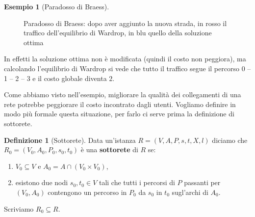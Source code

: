 \documentclass[a4paper]{article}
\newcounter{counter1}
\theoremstyle{plain}
\theoremstyle{definition}
\newtheorem{mydef}[counter1]{Definizione}
\newtheorem{myes}[counter1]{Esempio}
\theoremstyle{remark}
\newcommand{\pa}[1]{\left(#1\right)}
\begin{document}
\begin{myes}[Paradosso di Braess{\cite[pag. 263]{braess1968}}]
  \begin{figure}[ht]
    \centering

    \caption{Paradosso di Braess: dopo aver aggiunto la nuova strada,
      in rosso il traffico dell'equilibrio di Wardrop, in blu quello
      della soluzione ottima}
    \label{fig:braess-dopo}
  \end{figure}

  In effetti la soluzione ottima non è modificata (quindi il costo non
  peggiora), ma calcolando l'equilibrio di Wardrop si vede che tutto
  il traffico segue il percorso 0 -- 1 -- 2 -- 3 e il costo globale
  diventa $2$.
\end{myes}

Come abbiamo visto nell'esempio, migliorare la qualità dei
collegamenti di una rete potrebbe peggiorare il costo incontrato dagli
utenti. Vogliamo definire in modo più formale questa situazione, per
farlo ci serve prima la definizione di sottorete.

\begin{mydef}[Sottorete]
\label{def:sottorete}
  Data un'istanza $R=(V,A,P,s,t,X,l)$ diciamo che
  $R_0=(V_0,A_0,P_0,s_0,t_0)$ è una \textbf{sottorete} di $R$ se:
  \begin{enumerate}
  \item $V_0 \subseteq V$ e $A_0 = A \cap \pa{V_0\times V_0}$,
  \item esistono due nodi $s_0,t_0\in V$ tali che tutti i percorsi di
    $P$ passanti per $\pa{V_0,A_0}$ contengono un percorso in $P_0$ da
    $s_0$ in $t_0$ sugl'archi di $A_0$.
  \end{enumerate}
  Scriviamo $R_0\subseteq R$.
\end{mydef}
\end{document}
